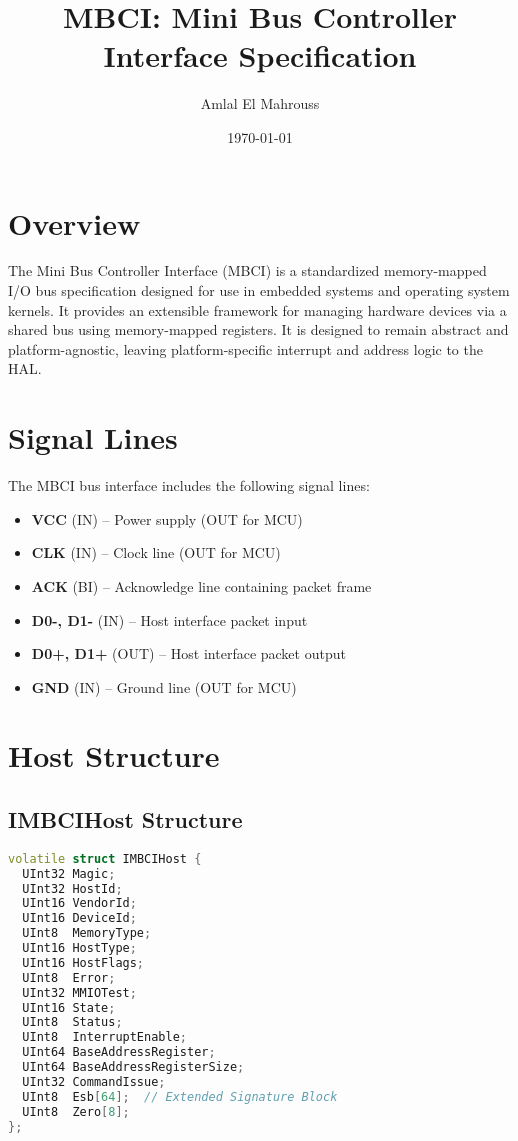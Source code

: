 \documentclass{article}
\title{MBCI: Mini Bus Controller Interface Specification}
\author{Amlal El Mahrouss}
\date{\today}
\begin{document}
\maketitle

\section{Overview}
The Mini Bus Controller Interface (MBCI) is a standardized memory-mapped I/O bus specification designed for use in embedded systems and operating system kernels. It provides an extensible framework for managing hardware devices via a shared bus using memory-mapped registers. It is designed to remain abstract and platform-agnostic, leaving platform-specific interrupt and address logic to the HAL.

\section{Signal Lines}
The MBCI bus interface includes the following signal lines:

\begin{itemize}
  \item \textbf{VCC} (IN) – Power supply (OUT for MCU)
  \item \textbf{CLK} (IN) – Clock line (OUT for MCU)
  \item \textbf{ACK} (BI) – Acknowledge line containing packet frame
  \item \textbf{D0-, D1-} (IN) – Host interface packet input
  \item \textbf{D0+, D1+} (OUT) – Host interface packet output
  \item \textbf{GND} (IN) – Ground line (OUT for MCU)
\end{itemize}

\section{Host Structure}

\subsection*{IMBCIHost Structure}

\begin{lstlisting}[language=C++,basicstyle=\ttfamily\footnotesize]
volatile struct IMBCIHost {
  UInt32 Magic;
  UInt32 HostId;
  UInt16 VendorId;
  UInt16 DeviceId;
  UInt8  MemoryType;
  UInt16 HostType;
  UInt16 HostFlags;
  UInt8  Error;
  UInt32 MMIOTest;
  UInt16 State;
  UInt8  Status;
  UInt8  InterruptEnable;
  UInt64 BaseAddressRegister;
  UInt64 BaseAddressRegisterSize;
  UInt32 CommandIssue;
  UInt8  Esb[64];  // Extended Signature Block
  UInt8  Zero[8];
};
\end{lstlisting}
\end{document}
